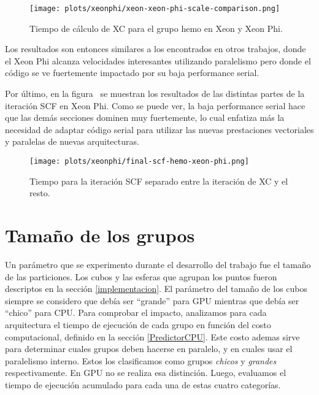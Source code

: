 \begin{figure}[htbp]
   \centering
   \texttt{[image: plots/xeonphi/xeon-xeon-phi-scale-comparison.png]}
   \caption{Tiempo de c\'alculo de XC para el grupo hemo en Xeon y Xeon Phi.}
   \label{fig:xeon-xeon-phi-parallelized-iteration}
\end{figure}

Los resultados son entonces similares a los encontrados en otros trabajos,
donde el Xeon Phi alcanza velocidades interesantes utilizando paralelismo
pero donde el c\'odigo se ve fuertemente impactado por su baja performance serial.

Por \'ultimo, en la figura~\label{fig:group-times-scf-xeon-phi} se muestran los resultados
de las distintas partes de la iteraci\'on SCF en Xeon Phi. Como se puede ver, la baja performance
serial hace que las dem\'as secciones dominen muy fuertemente, lo cual enfatiza m\'as la necesidad
de adaptar c\'odigo serial para utilizar las nuevas prestaciones vectoriales y paralelas de nuevas
arquitecturas.

\begin{figure}[htbp]
   \centering
   \texttt{[image: plots/xeonphi/final-scf-hemo-xeon-phi.png]}
   \caption{Tiempo para la iteraci\'on SCF separado entre la iteraci\'on de XC y el resto.}
   \label{fig:group-times-scf-xeon-phi}
\end{figure}


\section{Tama\~no de los grupos}
\label{tamgrupos}
Un par\'ametro que se experimento durante el desarrollo del trabajo fue el tama\~no de las particiones.
Los cubos y las esferas que agrupan los puntos fueron descriptos en la secci\'on \ref{implementacion}. El par\'ametro
del tama\~no de los cubos siempre se considero que deb\'ia ser ``grande'' para GPU mientras que deb\'ia ser
``chico'' para CPU. Para comprobar el impacto, analizamos para cada arquitectura el tiempo de ejecuci\'on
de cada grupo en funci\'on del costo computacional, definido en la secci\'on \ref{PredictorCPU}. Este costo ademas
sirve para determinar cuales grupos deben hacerse en paralelo, y en cuales usar el paralelismo interno. Estos
los clasificamos como grupos \textit{chicos} y \textit{grandes} respectivamente. En GPU no se realiza esa
distinci\'on. Luego, evaluamos el tiempo de ejecuci\'on acumulado para cada una de estas cuatro categor\'ias.


